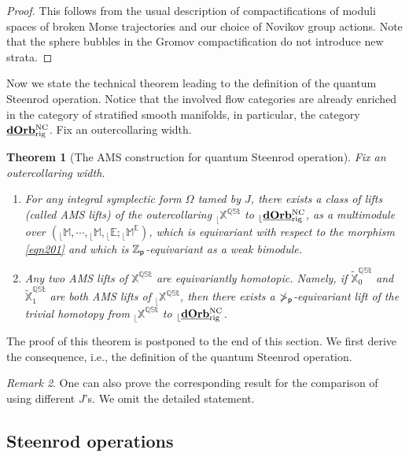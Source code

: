 \documentclass[reqno, 10pt]{amsart}
\numberwithin{equation}{section}
\numberwithin{equation}{section}
\newtheorem{thm}{Theorem}[section]
\theoremstyle{definition}
\theoremstyle{remark}
\newtheorem{rem}[thm]{Remark}
\newcommand{\mb}{\mathbb}
\newcommand{\p}{{\sf p}}
\newcommand{\zp}{{{\mb Z}_{\sf p}}}
\newcommand{\ep}{{{\mathbb E}}}
\renewcommand{\outer}{{}_{\lfloor}}
\newcommand{\uds}[1]{\underline{\smash{#1}}}
\begin{document}
\begin{proof}
    This follows from the usual description of compactifications of moduli spaces of broken Morse trajectories and our choice of Novikov group actions. Note that the sphere bubbles in the Gromov compactification do not introduce new strata.
\end{proof}

Now we state the technical theorem leading to the definition of the quantum Steenrod operation. Notice that the involved flow categories are already enriched in the category of stratified smooth manifolds, in particular, the category $\uds{\bf dOrb}_{\rm rig}^{\rm NC}$. Fix an outercollaring width.

\begin{thm}[The AMS construction for quantum Steenrod operation]\label{thm_QST_AMS}
Fix an outercollaring width.
\begin{enumerate}

\item For any integral symplectic form $\Omega$ tamed by $J$, there exists a class of lifts (called AMS lifts) of the outercollaring $\outer {\mb X}^{\mb{QSt}}$ to $\outer \uds{\bf dOrb}_{\rm rig}^{\rm NC}$, as a multimodule over $(\outer {\mb M}, \cdots, \outer{\mb M}, \outer \ep; \outer {\mb M}^\ep)$, which is equivariant with respect to the morphism \eqref{eqn201} and which is $\zp$-equivariant as a weak bimodule. 

\item Any two AMS lifts of $\mb{X}^{\mb{QSt}}$ are equivariantly homotopic. Namely, if $\tilde {\mb X}_0^{\mb{QSt}}$ and $\tilde {\mb X}_1^{\mb{QSt}}$ are both AMS lifts of $\outer \mb{X}^{\mb{QSt}}$, then there exists a $\mb\Pi_\p$-equivariant lift of the trivial homotopy from $\outer {\mb X}^{\mb{QSt}}$ to $\outer \uds{\bf dOrb}_{\rm rig}^{\rm NC}$.
\end{enumerate}
\end{thm}

The proof of this theorem is postponed to the end of this section. We first derive the consequence, i.e., the definition of the quantum Steenrod operation. 

\begin{rem}
One can also prove the corresponding result for the comparison of using different $J$'s. We omit the detailed statement.
\end{rem}




\subsection{Steenrod operations}
\end{document}
